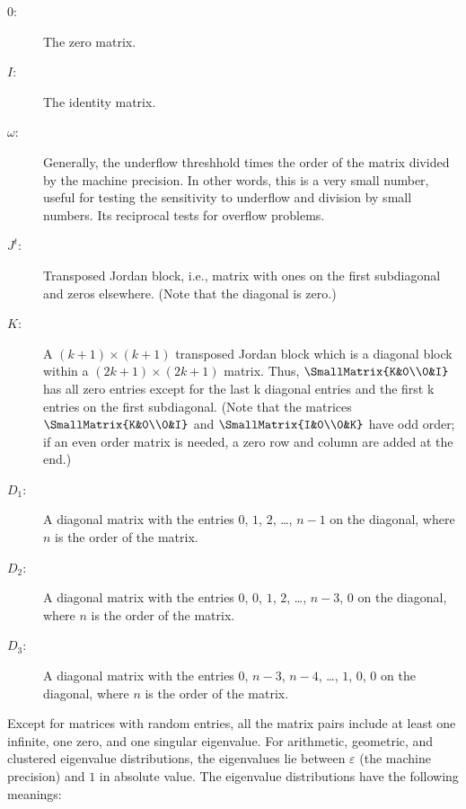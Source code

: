 \begin{description}

\item [$0$:]
The zero matrix.

\item [$I$:]
The identity matrix.

\item [$\omega$:]
Generally, the underflow threshhold
times the order of the matrix
divided by the machine precision.
In other words, this is a very small number, useful for testing
the sensitivity to underflow and division by small numbers.
Its reciprocal tests for overflow problems.

\item [$J^t$:]
Transposed Jordan block, i.e.,
matrix with ones on the first
subdiagonal and zeros elsewhere.
(Note that the diagonal is zero.)

\item [$K$:]
A $(k+1)\times(k+1)$ transposed Jordan block which
is a diagonal block within a $(2k+1)\times(2k+1)$ matrix.
Thus, $\SmallMatrix{K&0\\0&I}$
has all zero entries except for the last k diagonal
entries and the first k entries
on the first subdiagonal.
(Note that the matrices $\SmallMatrix{K&0\\0&I}$
and $\SmallMatrix{I&0\\0&K}$ have odd order;
if an even order matrix is needed, a zero row and column
are added at the end.)

\item [$D_1$:]
A diagonal matrix with the entries $0$, $1$, $2$, \ldots, $n-1$
on the diagonal, where $n$ is the order of the matrix.

\item [$D_2$:]
A diagonal matrix with the entries
$0$, $0$, $1$, $2$, \ldots, $n-3$, $0$
on the diagonal, where $n$ is the order of the matrix.

\item [$D_3$:]
A diagonal matrix with the entries
$0$, $n-3$, $n-4$, \ldots, $1$, $0$, $0$
on the diagonal, where $n$ is the order of the matrix.

\end{description}

Except for matrices with random entries,
all the matrix pairs include at least one infinite, one zero,
and one singular eigenvalue.
For arithmetic, geometric, and clustered eigenvalue distributions,
the eigenvalues
lie between $\varepsilon$ (the machine precision)
and $1$ in absolute value.
The eigenvalue distributions have the following meanings:

